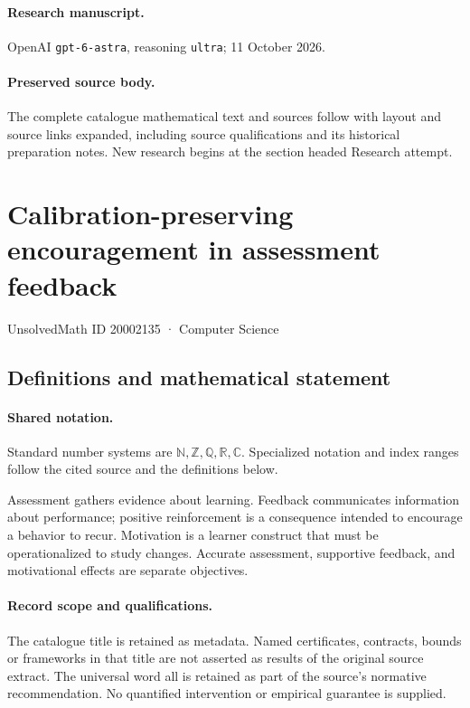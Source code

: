 \documentclass[11pt]{article}
\begin{document}
\paragraph{Research manuscript.} OpenAI \texttt{gpt-6-astra}, reasoning \texttt{ultra}; 11 October 2026.
\paragraph{Preserved source body.} The complete catalogue mathematical text and sources follow with layout and source links expanded, including source qualifications and its historical preparation notes. New research begins at the section headed Research attempt.

\section{Calibration-preserving encouragement in assessment feedback}\label{20002135}
{\small UnsolvedMath ID 20002135 · Computer Science}
\subsection{Definitions and mathematical statement}

\paragraph{Shared notation.}Standard number systems are $\mathbb N,\mathbb Z,\mathbb Q,\mathbb R,\mathbb C$. Specialized notation and index ranges follow the cited source and the definitions below.


Assessment gathers evidence about learning. Feedback communicates information about performance; positive reinforcement is a consequence intended to encourage a behavior to recur. Motivation is a learner construct that must be operationalized to study changes. Accurate assessment, supportive feedback, and motivational effects are separate objectives.
\paragraph{Record scope and qualifications.}
The catalogue title is retained as metadata. Named certificates, contracts, bounds or frameworks in that title are not asserted as results of the original source extract.
The universal word all is retained as part of the source's normative recommendation. No quantified intervention or empirical guarantee is supplied.
\end{document}
